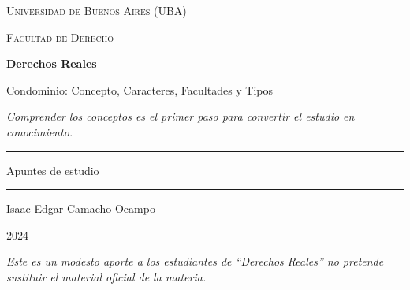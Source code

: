\documentclass[12pt,oneside]{book}
\newcommand{\universidad}{Universidad de Buenos Aires (UBA)}
\newcommand{\facultad}{Facultad de Derecho}
\newcommand{\materia}{Derechos Reales}
\newcommand{\titulo}{Condominio: Concepto, Caracteres, Facultades y Tipos}
\newcommand{\autor}{Isaac Edgar Camacho Ocampo}
\newcommand{\anio}{2024}
\begin{document}
\begin{titlepage}

\thispagestyle{empty}

\begin{center}

\vspace*{1cm}

{\large \textsc{\universidad}}

\vspace{0.2cm}

{\large \textsc{\facultad}}

\vspace{3cm}

{\Huge \textbf{\materia}}

\vspace{1cm}

{\LARGE \titulo}

\vspace{0.8cm}

\textit{Comprender los conceptos es el primer paso para convertir el estudio en conocimiento.}

\vspace{1.2cm}

\rule{0.70\textwidth}{0.5pt}

\vspace{0.5cm}

{\large Apuntes de estudio}

\vspace{0.5cm}

\rule{0.70\textwidth}{0.5pt}

\vfill

{\large \autor}

\vspace{0.3cm}

{\large \anio}

\end{center}

\vfill

\begin{flushleft}
\textit{Este es un modesto aporte a los estudiantes de ``\materia'' no pretende sustituir el material oficial de la materia.}
\end{flushleft}

\end{titlepage}

\tableofcontents
\end{document}
